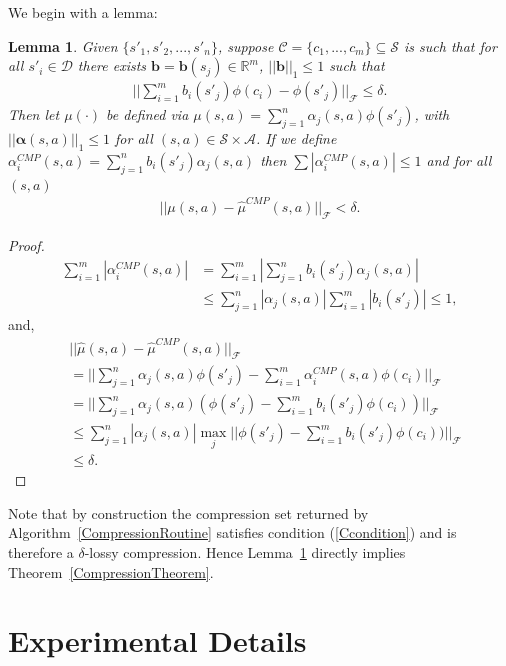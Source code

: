 \documentclass[letterpaper]{article}
\newtheorem{lemma}[theorem]{Lemma}
\newcommand{\cD}{{\mathcal D}}
\newcommand{\cC}{{\mathcal C}}
\newcommand{\cF}{{\mathcal F}}
\newcommand{\cA}{{\mathcal A}}
\newcommand{\cS}{{\mathcal S}}
\newcommand{\balpha}{{\bm \alpha}}
\newcommand{\R}{{\mathbb R}}
\newcommand{\nn}{\nonumber}
\begin{document}
We begin with a lemma:

\begin{lemma}\label{CMPlemma} Given $\{s'_1,s'_2,...,s'_n\}$, suppose $\cC = \{ c_1,...,c_m \}\subseteq \cS$ is such that for all $s'_i\in\cD$ there exists ${\bm b} = {\bm b}(s_j)\in\R^m$, $||\bm b||_1\le 1$ such that
\begin{align}
||\sum_{i=1}^m b_i(s'_j) \phi(c_i) - \phi(s'_j)||_{\cF} \le \delta. \label{Ccondition}
\end{align}
Then let $\mu(\cdot)$ be defined via $\mu(s,a) = \sum_{j=1}^n \alpha_j(s,a) \phi(s'_j)$, with $||\balpha(s,a)||_1\le 1$ for all $(s,a)\in\cS\times\cA$. 
If we define $\alpha^{CMP}_i(s,a)=\sum_{j=1}^n b_i(s'_j) \alpha_j(s,a)$ then $\sum |\alpha^{CMP}_i(s,a)|\le 1$ and for all $(s,a)$
\begin{align}
||\mu(s,a) - \hat\mu^{CMP}(s,a)||_\cF < \delta. \nn
\end{align}
\end{lemma}

\begin{proof}
\begin{align}
\sum_{i=1}^m |\alpha^{CMP}_i(s,a)| & = \sum_{i=1}^m |\sum_{j=1}^n b_i(s'_j) \alpha_j(s,a)| \nn\\
&\le \sum_{j=1}^n|\alpha_j(s,a)| \sum_{i=1}^m  |b_i(s'_j)| \le 1, \nn
\end{align}
and,
\begin{align}
&||\hat\mu(s,a) - \hat\mu^{CMP}(s,a)||_\cF \nn\\
&= || \sum_{j=1}^n \alpha_j(s,a) \phi(s'_j) - \sum_{i=1}^m \alpha^{CMP}_i(s,a) \phi(c_i) ||_\cF \nn\\
&= || \sum_{j=1}^n \alpha_j(s,a)( \phi(s'_j) - \sum_{i=1}^m b_i(s'_j)  \phi(c_i)) ||_\cF \nn\\
&\le \sum_{j=1}^n |\alpha_j(s,a)| \max_j || \phi(s'_j) - \sum_{i=1}^m b_i(s'_j)  \phi(c_i)) ||_\cF\nn\\
&\le \delta.\nn
\end{align}
\end{proof}

Note that by construction the compression set returned by Algorithm~\ref{CompressionRoutine} satisfies condition (\ref{Ccondition}) and is therefore a $\delta$-lossy compression. Hence Lemma~\ref{CMPlemma} directly implies Theorem~\ref{CompressionTheorem}.


\section{Experimental Details} \label{ExperimentDetails}
\end{document}
